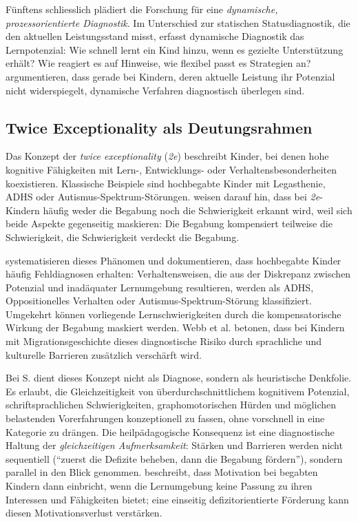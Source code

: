 \documentclass[ngerman, a4paper]{article}
\begin{document}
Fünftens schliesslich plädiert die Forschung für eine \textit{dynamische,
prozessorientierte Diagnostik}. Im Unterschied zur statischen Statusdiagnostik,
die den aktuellen Leistungsstand misst, erfasst dynamische Diagnostik das Lernpotenzial:
Wie schnell lernt ein Kind hinzu, wenn es gezielte Unterstützung erhält? Wie reagiert es
auf Hinweise, wie flexibel passt es Strategien an? \textcite{preckel2013hochbegabung} argumentieren,
dass gerade bei Kindern, deren aktuelle Leistung ihr Potenzial nicht widerspiegelt,
dynamische Verfahren diagnostisch überlegen sind.

\subsection{Twice Exceptionality als Deutungsrahmen}
\label{subsec:2e}

Das Konzept der \textit{twice exceptionality} (\textit{2e}) beschreibt Kinder, bei denen
hohe kognitive Fähigkeiten mit Lern-, Entwicklungs- oder Verhaltensbesonderheiten
koexistieren. Klassische Beispiele sind hochbegabte Kinder mit Legasthenie, ADHS
oder Autismus-Spektrum-Störungen. \textcite{preckel2013hochbegabung} weisen darauf hin, dass
bei \textit{2e}-Kindern häufig weder die Begabung noch die Schwierigkeit erkannt wird,
weil sich beide Aspekte gegenseitig maskieren: Die Begabung kompensiert teilweise die
Schwierigkeit, die Schwierigkeit verdeckt die Begabung.

\textcite{webb2020doppeldiagnosen} systematisieren dieses Phänomen und
dokumentieren, dass hochbegabte Kinder häufig Fehldiagnosen erhalten:
Verhaltensweisen, die aus der Diskrepanz zwischen Potenzial und inadäquater
Lernumgebung resultieren, werden als ADHS, Oppositionelles Verhalten oder
Autismus-Spektrum-Störung klassifiziert. Umgekehrt können vorliegende
Lernschwierigkeiten durch die kompensatorische Wirkung der Begabung maskiert
werden. Webb et al. betonen, dass bei Kindern mit Migrationsgeschichte
dieses diagnostische Risiko durch sprachliche und kulturelle Barrieren
zusätzlich verschärft wird.

Bei S. dient dieses Konzept nicht als Diagnose, sondern als heuristische Denkfolie. Es
erlaubt, die Gleichzeitigkeit von überdurchschnittlichem kognitivem Potenzial,
schriftsprachlichen Schwierigkeiten, graphomotorischen Hürden und möglichen
belastenden Vorerfahrungen konzeptionell zu fassen, ohne vorschnell in eine Kategorie
zu drängen. Die heilpädagogische Konsequenz ist eine diagnostische Haltung der
\textit{gleichzeitigen Aufmerksamkeit}: Stärken und Barrieren werden nicht sequentiell
(\enquote{zuerst die Defizite beheben, dann die Begabung fördern}), sondern parallel in den
Blick genommen. \textcite{lehwald2017motivation} beschreibt, dass Motivation bei begabten Kindern dann
einbricht, wenn die Lernumgebung keine Passung zu ihren Interessen und Fähigkeiten
bietet; eine einseitig defizitorientierte Förderung kann diesen Motivationsverlust
verstärken.
\end{document}

